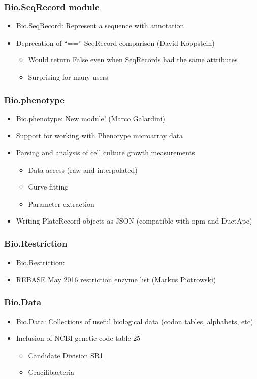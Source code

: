 \documentclass[trans]{beamer}
\begin{document}
\frame
{
  \frametitle{Bio.SeqRecord module}
  
  \begin{itemize}
  \item Bio.SeqRecord: Represent a sequence with annotation
  \item Deprecation of ``=='' SeqRecord comparison (David Koppstein)
  \begin{itemize}
  \item Would return False even when SeqRecords had the same attributes
  \item Surprising for many users
  \end{itemize}
  \end{itemize}
}

\frame
{
  \frametitle{Bio.phenotype}
  
  \begin{itemize}
  \item Bio.phenotype: New module! (Marco Galardini)
  \item Support for working with Phenotype microarray data
  \item Parsing and analysis of cell culture growth measurements
  \begin{itemize}
  \item Data access (raw and interpolated)
  \item Curve fitting
  \item Parameter extraction
  \end{itemize}
  \item Writing PlateRecord objects as JSON (compatible with opm and DuctApe)
  \end{itemize}
}

\frame
{
  \frametitle{Bio.Restriction}
  
  \begin{itemize}
  \item Bio.Restriction: 
  \item REBASE May 2016 restriction enzyme list (Markus Piotrowski)
  \end{itemize}
}

\frame
{
  \frametitle{Bio.Data}
  
  \begin{itemize}
  \item Bio.Data: Collections of useful biological data (codon tables, alphabets, etc)
  \item Inclusion of NCBI genetic code table 25
  \begin{itemize}
  \item Candidate Division SR1
  \item Gracilibacteria
  \end{itemize}
  \end{itemize}
}
\end{document}
